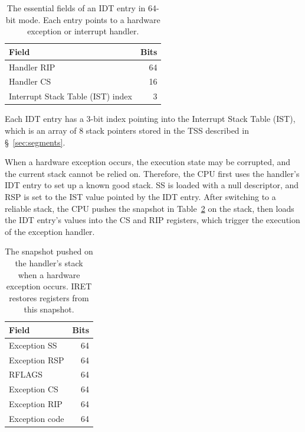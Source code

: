 \begin{table}[hbt]
  \centering
  \begin{tabular}{| l | r |}
  \hline
  \textbf{Field} & \textbf{Bits} \\
  \hline
  Handler RIP & 64 \\
  \hline
  Handler CS & 16 \\
  \hline
  Interrupt Stack Table (IST) index & 3 \\
  \hline
  \end{tabular}
  \caption{
    The essential fields of an IDT entry in 64-bit mode. Each entry points to a
    hardware exception or interrupt handler.
  }
  \label{fig:idt_entry}
\end{table}

Each IDT entry has a 3-bit index pointing into the Interrupt Stack Table (IST),
which is an array of 8 stack pointers stored in the TSS described in
\S~\ref{sec:segments}.


When a hardware exception occurs, the execution state may be corrupted, and the
current stack cannot be relied on. Therefore, the CPU first uses the handler's
IDT entry to set up a known good stack. SS is loaded with a null descriptor,
and RSP is set to the IST value pointed by the IDT entry. After switching to a
reliable stack, the CPU pushes the snapshot in Table~\ref{fig:fault_stack} on
the stack, then loads the IDT entry's values into the CS and RIP registers,
which trigger the execution of the exception handler.

\begin{table}[hbt]
  \centering
  \begin{tabular}{| l | r |}
  \hline
  \textbf{Field} & \textbf{Bits} \\
  \hline
  Exception SS & 64 \\
  \hline
  Exception RSP & 64 \\
  \hline
  RFLAGS & 64 \\
  \hline
  Exception CS & 64 \\
  \hline
  Exception RIP & 64 \\
  \hline
  Exception code & 64 \\
  \hline
  \end{tabular}
  \caption{
    The snapshot pushed on the handler's stack when a hardware exception
    occurs. IRET restores registers from this snapshot.
  }
  \label{fig:fault_stack}
\end{table}

